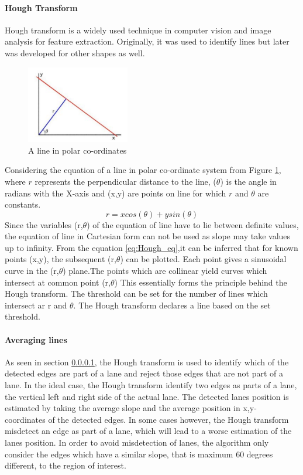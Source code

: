 \paragraph{Hough Transform}
\label{par:Hough_t}
Hough transform is a widely used  technique in computer vision and image analysis for feature extraction. Originally, it was used to identify lines but later was developed for other shapes as well. 
\begin{figure}[H]
    \centering
    \includegraphics[width = 0.4\textwidth]{Figures/line_pol.pdf}
    \caption{A line in polar co-ordinates}
    \label{fig:Hough}
\end{figure}
Considering the equation of a line in polar co-ordinate system from Figure \ref{fig:Hough}, where $r$ represents the perpendicular distance to the line, ($\theta$) is the angle in radians with the X-axis and (x,y) are points on line for which $r$ and $\theta$ are constants.
\begin{equation}
    r = x cos(\theta) + y sin(\theta)
    \label{eq:Hough_eq}
\end{equation}
Since the variables (r,$\theta$) of the equation of line have to lie between definite values, the equation of line in Cartesian form can not be used as slope may take values up to infinity.
From the equation \ref{eq:Hough_eq},it can be inferred that for known points (x,y), the subsequent (r,$\theta$) can be plotted. Each point gives a sinusoidal curve in the (r,$\theta$) plane.The points which are collinear yield curves which intersect at common point (r,$\theta$)  This essentially forms the principle behind the Hough transform. The threshold can be set for the number of lines which intersect ar r and $\theta$. The Hough transform declares a line based on the set threshold. 



\paragraph{Averaging lines}
As seen in section \ref{par:Hough_t}, the Hough transform is used to identify which of the detected edges are part of a lane and reject those edges that are not part of a lane.  In the ideal case, the Hough transform identify two edges as parts of a lane, the vertical left and right side of the actual lane. The detected lanes position is estimated by taking the average slope and the average position in x,y- coordinates of the detected edges. In some cases however, the Hough transform misdetect an edge as part of a lane, which will lead to a worse estimation of the lanes position. In order to avoid misdetection of lanes, the algorithm only consider the edges which have a similar slope, that is maximum 60 degrees different, to the region of interest.  

